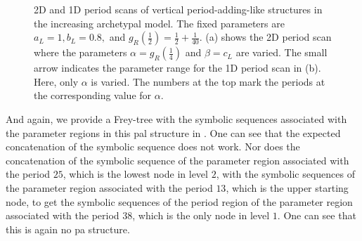 \begin{figure}
	\centering
	\caption[2D and 1D period scans of vertical period-adding-like structures in the increasing archetypal model]{
		2D and 1D period scans of vertical period-adding-like structures in the increasing archetypal model.
		The fixed parameters are $a_L = 1, b_L = 0.8,$ and $g_R\left(\frac{1}{2}\right) = \frac{1}{2} + \frac{1}{40}$.
		(a) shows the 2D period scan where the parameters $\alpha = g_R\left(\frac{1}{4}\right)$ and $\beta = c_L$ are varied.
		The small arrow indicates the parameter range for the 1D period scan in (b).
		Here, only $\alpha$ is varied.
		The numbers at the top mark the periods at the corresponding value for $\alpha$.
	}
	\label{fig:add.add.like.vert}
\end{figure}

And again, we provide a Frey-tree with the symbolic sequences associated with the parameter regions in this \gls{pal} structure in .
One can see that the expected concatenation of the symbolic sequence does not work.
Nor does the concatenation of the symbolic sequence of the parameter region associated with the period $25$, which is the lowest node in level $2$, with the symbolic sequences of the parameter region associated with the period $13$, which is the upper starting node, to get the symbolic sequences of the period region of the parameter region associated with the period $38$, which is the only node in level $1$.
One can see that this is again no \gls{pa} structure.

